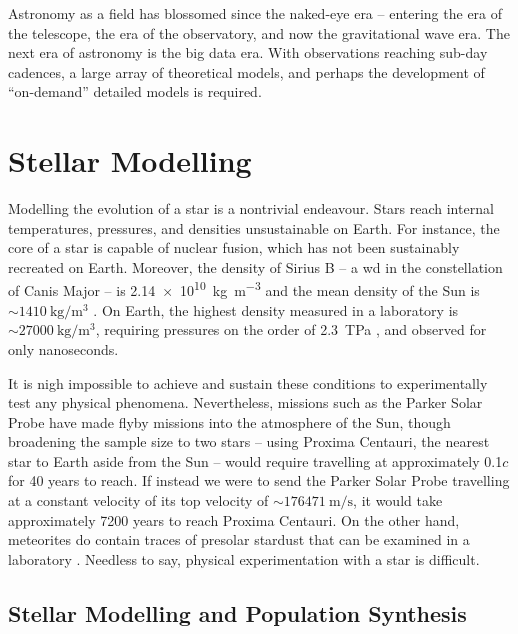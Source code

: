 Astronomy as a field has blossomed since the naked-eye era -- entering the era of the telescope, the era of the observatory, and now the gravitational wave era. The next era of astronomy is the big data era. With observations reaching sub-day cadences, a large array of theoretical models, and perhaps the development of ``on-demand'' detailed models is required.

\section{Stellar Modelling}

Modelling the evolution of a star is a nontrivial endeavour. Stars reach internal temperatures, pressures, and densities unsustainable on Earth. For instance, the core of a star is capable of nuclear fusion, which has not been sustainably recreated on Earth. Moreover, the density of Sirius B -- a \gls{wd} in the constellation of Canis Major -- is \SI{2.14e10}{\kg\per\meter\cubed} \citep{Barstow:2005} and the mean density of the Sun is $\sim\SI{1410}{\kg\per\meter\cubed}$ \citep{Eddy:1979}. On Earth, the highest density measured in a laboratory is $\sim\SI{27000}{\kg\per\meter\cubed}$, requiring pressures on the order of \SI{2.3}{\tera\pascal} \citep{Fratanduono:2020}, and observed for only nanoseconds.

It is nigh impossible to achieve and sustain these conditions to experimentally test any physical phenomena. Nevertheless, missions such as the Parker Solar Probe have made flyby missions into the atmosphere of the Sun, though broadening the sample size to two stars -- using Proxima Centauri, the nearest star to Earth aside from the Sun -- would require travelling at approximately 0.1$c$ for 40 years to reach. If instead we were to send the Parker Solar Probe travelling at a constant velocity of its top velocity of $\sim\SI{176471}{\meter\per\second}$, it would take approximately 7200 years to reach Proxima Centauri. On the other hand, meteorites do contain traces of presolar stardust that can be examined in a laboratory \citep{Clayton:2004}. Needless to say, physical experimentation with a star is difficult.

\subsection{Stellar Modelling and Population Synthesis}

